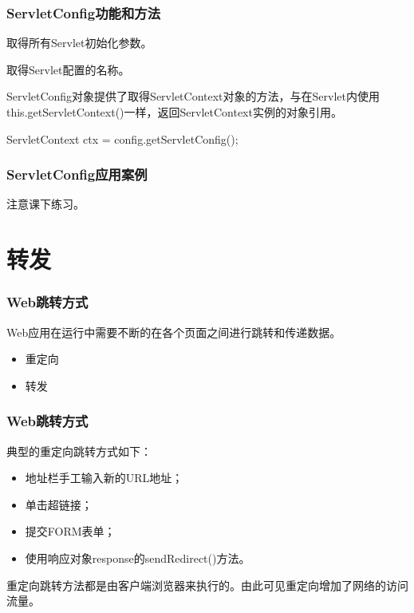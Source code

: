 \begin{frame}[fragile] %
\frametitle{ServletConfig功能和方法} 


取得所有Servlet初始化参数。


取得Servlet配置的名称。


ServletConfig对象提供了取得ServletContext对象的方法，与在Servlet内使用this.getServletContext()一样，返回ServletContext实例的对象引用。

\begin{javaCode}
ServletContext ctx = config.getServletConfig();
\end{javaCode}
\end{frame}

\begin{frame}[fragile] %
\frametitle{ServletConfig应用案例} 

注意课下练习。

\end{frame}

\section{转发}

\begin{frame}[fragile] %
\frametitle{Web跳转方式} 

Web应用在运行中需要不断的在各个页面之间进行跳转和传递数据。
\begin{itemize}
\item 重定向
\item 转发
\end{itemize}

\end{frame}

\begin{frame}[fragile] %
\frametitle{Web跳转方式} 


典型的重定向跳转方式如下：

\begin{itemize}
\item 地址栏手工输入新的URL地址；
\item 单击超链接；
\item 提交FORM表单；
\item 使用响应对象response的sendRedirect()方法。
\end{itemize}

{\hei 重定向跳转方法都是由客户端浏览器来执行的。}由此可见重定向增加了网络的访问流量。
\end{frame}

